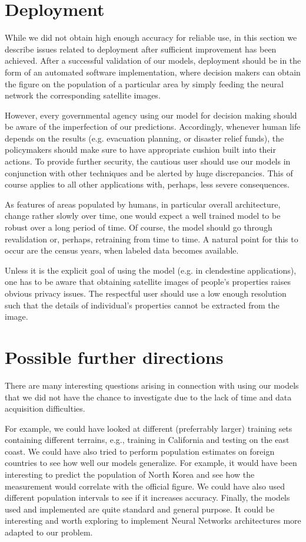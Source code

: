 \documentclass{article}
\begin{document}
\section{Deployment}
While we did not obtain high enough accuracy for reliable use, in this section we describe issues related to deployment after sufficient improvement has been achieved. After a successful validation of our models, deployment should be in the form of an automated software implementation, where decision makers can obtain the figure on the population of a particular area by simply feeding the neural network the corresponding satellite images.

However, every governmental agency using our model for decision making should be aware of the imperfection of our predictions. Accordingly, whenever human life depends on the results (e.g. evacuation planning, or disaster relief funds), the policymakers should make sure to have appropriate cushion built into their actions. To provide further security, the cautious user should use our models in conjunction with other techniques and be alerted by huge discrepancies. This of course applies to all other applications with, perhaps, less severe consequences.

As features of areas populated by humans, in particular overall architecture, change rather slowly over time, one would expect a well trained model to be robust over a long period of time. Of course, the model should go through revalidation or, perhaps, retraining from time to time. A natural point for this to occur are the census years, when labeled data becomes available.

Unless it is the explicit goal of using the model (e.g. in clendestine applications), one has to be aware that obtaining satellite images of people's properties raises obvious privacy issues. The respectful user should use a low enough resolution such that the details of individual's properties cannot be extracted from the image.

\section{Possible further directions}

There are many interesting questions arising in connection with using our models that we did not have the chance to investigate due to the lack of time and data acquisition difficulties.

For example, we could have looked at different (preferrably larger) training sets containing different terrains, e.g., training in California and testing on the east coast. We could have also tried to perform population estimates on foreign countries to see how well our models generalize. For example, it would have been interesting to predict the population of North Korea and see how the measurement would correlate with the official figure. We could have also used different population intervals to see if it increases accuracy. Finally, the models used and implemented are quite standard and general purpose. It could be interesting and worth exploring to implement Neural Networks architectures more adapted to our problem.
\end{document}
